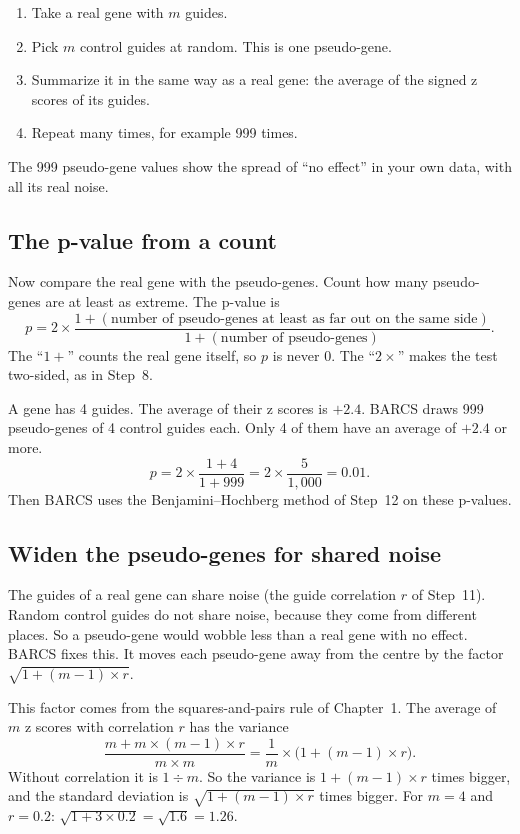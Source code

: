 \begin{enumerate}
\item Take a real gene with $m$ guides.
\item Pick $m$ control guides at random. This is one pseudo-gene.
\item Summarize it in the same way as a real gene: the average of the signed
  z scores of its guides.
\item Repeat many times, for example 999 times.
\end{enumerate}

The 999 pseudo-gene values show the spread of ``no effect'' in your own
data, with all its real noise.

\subsection{The p-value from a count}

Now compare the real gene with the pseudo-genes. Count how many pseudo-genes
are at least as extreme. The p-value is
\[
p = 2 \times \frac{1 + (\text{number of pseudo-genes at least as far out on the same side})}{1 + (\text{number of pseudo-genes})} .
\]
The ``$1 +$'' counts the real gene itself, so $p$ is never 0. The
``$2 \times$'' makes the test two-sided, as in Step~8.

\begin{worked}
A gene has 4 guides. The average of their z scores is $+2.4$. BARCS draws
999 pseudo-genes of 4 control guides each. Only 4 of them have an average
of $+2.4$ or more.
\[
p = 2 \times \frac{1 + 4}{1 + 999} = 2 \times \frac{5}{1{,}000} = 0.01 .
\]
Then BARCS uses the Benjamini--Hochberg method of Step~12 on these
p-values.
\end{worked}

\subsection{Widen the pseudo-genes for shared noise}

The guides of a real gene can share noise (the guide correlation $r$ of
Step~11). Random control guides do not share noise, because they come from
different places. So a pseudo-gene would wobble less than a real gene with
no effect. BARCS fixes this. It moves each pseudo-gene away from the centre
by the factor $\sqrt{1 + (m-1) \times r}$.

This factor comes from the squares-and-pairs rule of Chapter~1. The average
of $m$ z scores with correlation $r$ has the variance
\[
\frac{m + m \times (m-1) \times r}{m \times m}
 = \frac{1}{m} \times \bigl(1 + (m-1) \times r\bigr) .
\]
Without correlation it is $1 \div m$. So the variance is
$1 + (m-1) \times r$ times bigger, and the standard deviation is
$\sqrt{1 + (m-1) \times r}$ times bigger. For $m = 4$ and $r = 0.2$:
$\sqrt{1 + 3 \times 0.2} = \sqrt{1.6} = 1.26$.

